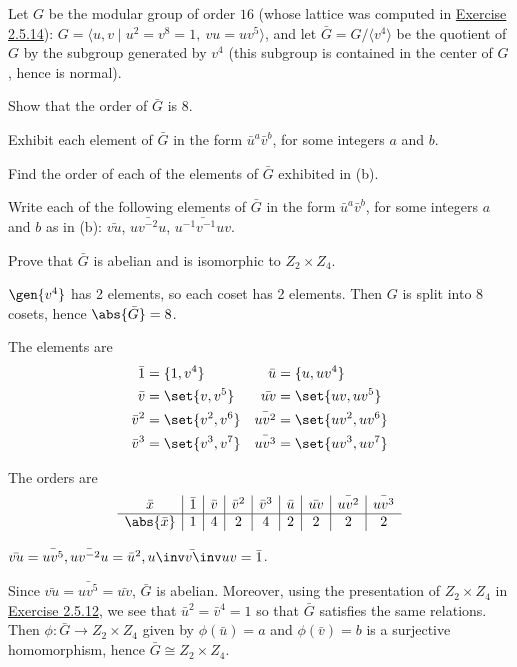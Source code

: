 \begin{exercise}\label{ex3.1.19}
    Let $G$ be the modular group of order $16$ (whose lattice was computed in \hyperref[ex2.5.14]{Exercise 2.5.14}): $G = \langle u,v \mid u^2 = v^8 = 1,\ vu = uv^5 \rangle$, and let $\bar{G} = G/\langle v^4 \rangle$ be the quotient of $G$ by the subgroup generated by $v^4$ (this subgroup is contained in the center of $G$, hence is normal).
    \begin{subproblems}
        \item Show that the order of $\bar{G}$ is $8$.
        \item Exhibit each element of $\bar{G}$ in the form $\bar{u}^a \bar{v}^b$, for some integers $a$ and $b$.
        \item Find the order of each of the elements of $\bar{G}$ exhibited in (b).
        \item Write each of the following elements of $\bar{G}$ in the form $\bar{u}^a \bar{v}^b$, for some integers $a$ and $b$ as in (b): $\bar{vu}$, $\bar{uv^{-2}u}$, $\bar{u^{-1}v^{-1}uv}$.
        \item Prove that $\bar{G}$ is abelian and is isomorphic to $Z_2 \times Z_4$.
    \end{subproblems}
\end{exercise}

\begin{solalph}
    \item $\gen{v^4}$ has 2 elements, so each coset has 2 elements. Then $G$ is split into 8 cosets, hence $\abs{\bar G} = 8$.
    \item The elements are
    \begin{align*}
        \bar 1 & = \{1, v^4\} & \bar u & = \{u, uv^4\} \\
        \bar v & = \set{v, v^5} & \bar{uv} & = \set{uv, uv^5} \\
        \bar v^2 & = \set{v^2, v^6} & \bar{uv^2} & = \set{uv^2, uv^6} \\
        \bar v^3 & = \set{v^3, v^7} & \bar{uv^3} & = \set{uv^3, uv^7}
    \end{align*}
    \item The orders are
    \[
    \begin{array}{c|c|c|c|c|c|c|c|c}
        \bar x & \bar 1 & \bar v & \bar v^2 & \bar v^3 & \bar u & \bar{uv} & \bar{uv^2} & \bar{uv^3} \\
        \hline
        \abs{\bar x} & 1 & 4 & 2 & 4 & 2 & 2 & 2 & 2
    \end{array}
    \]
    \item $\bar{vu} = \bar{uv^5}, \bar{uv^{-2}u} = \bar u^2, \bar{u\inv v\inv uv} = \bar 1$.
    \item Since $\bar{vu} = \bar{uv^5} = \bar{uv}$, $\bar G$ is abelian. Moreover, using the presentation of $Z_2 \times Z_4$ in \hyperref[ex2.5.12]{Exercise 2.5.12}, we see that $\bar u^2 = \bar v^4 = 1$ so that $\bar G$ satisfies the same relations. Then $\phi : \bar G \to Z_2 \times Z_4$ given by $\phi(\bar u) = a$ and $\phi(\bar v) = b$ is a surjective homomorphism, hence $\bar G \cong Z_2 \times Z_4$.
\end{solalph}

